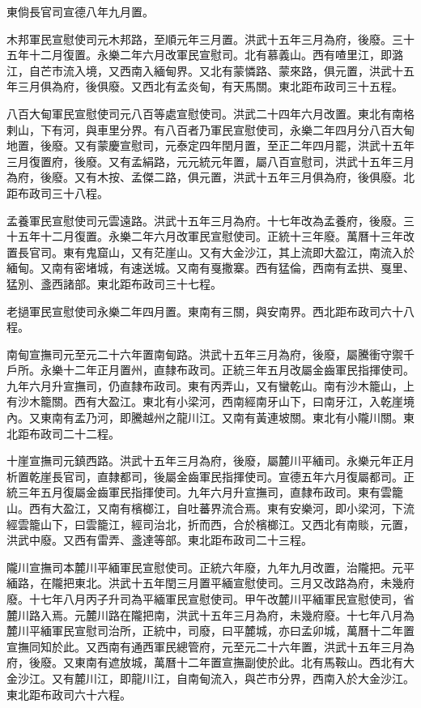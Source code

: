 東倘長官司宣德八年九月置。

木邦軍民宣慰使司元木邦路，至順元年三月置。洪武十五年三月為府，後廢。三十五年十二月復置。永樂二年六月改軍民宣慰司。北有慕義山。西有喳里江，即潞江，自芒市流入境，又西南入緬甸界。又北有蒙憐路、蒙來路，俱元置，洪武十五年三月俱為府，後俱廢。又西北有孟炎甸，有天馬關。東北距布政司三十五程。

八百大甸軍民宣慰使司元八百等處宣慰使司。洪武二十四年六月改置。東北有南格剌山，下有河，與車里分界。有八百者乃軍民宣慰使司，永樂二年四月分八百大甸地置，後廢。又有蒙慶宣慰司，元泰定四年閏月置，至正二年四月罷，洪武十五年三月復置府，後廢。又有孟絹路，元元統元年置，屬八百宣慰司，洪武十五年三月為府，後廢。又有木按、孟傑二路，俱元置，洪武十五年三月俱為府，後俱廢。北距布政司三十八程。

孟養軍民宣慰使司元雲遠路。洪武十五年三月為府。十七年改為孟養府，後廢。三十五年十二月復置。永樂二年六月改軍民宣慰使司。正統十三年廢。萬曆十三年改置長官司。東有鬼窟山，又有茫崖山。又有大金沙江，其上流即大盈江，南流入於緬甸。又南有密堵城，有速送城。又南有戛撒寨。西有猛倫，西南有孟拱、戛里、猛別、盞西諸部。東北距布政司三十七程。

老撾軍民宣慰使司永樂二年四月置。東南有三關，與安南界。西北距布政司六十八程。

南甸宣撫司元至元二十六年置南甸路。洪武十五年三月為府，後廢，屬騰衝守禦千戶所。永樂十二年正月置州，直隸布政司。正統三年五月改屬金齒軍民指揮使司。九年六月升宣撫司，仍直隸布政司。東有丙弄山，又有蠻乾山。南有沙木籠山，上有沙木籠關。西有大盈江。東北有小梁河，西南經南牙山下，曰南牙江，入乾崖境內。又東南有孟乃河，即騰越州之龍川江。又南有黃連坡關。東北有小隴川關。東北距布政司二十二程。

十崖宣撫司元鎮西路。洪武十五年三月為府，後廢，屬麓川平緬司。永樂元年正月析置乾崖長官司，直隸都司，後屬金齒軍民指揮使司。宣德五年六月復屬都司。正統三年五月復屬金齒軍民指揮使司。九年六月升宣撫司，直隸布政司。東有雲籠山。西有大盈江，又南有檳榔江，自吐蕃界流合焉。東有安樂河，即小梁河，下流經雲籠山下，曰雲籠江，經司治北，折而西，合於檳榔江。又西北有南賧，元置，洪武中廢。又西有雷弄、盞達等部。東北距布政司二十三程。

隴川宣撫司本麓川平緬軍民宣慰使司。正統六年廢，九年九月改置，治隴把。元平緬路，在隴把東北。洪武十五年閏三月置平緬宣慰使司。三月又改路為府，未幾府廢。十七年八月丙子升司為平緬軍民宣慰使司。甲午改麓川平緬軍民宣慰使司，省麓川路入焉。元麓川路在隴把南，洪武十五年三月為府，未幾府廢。十七年八月為麓川平緬軍民宣慰司治所，正統中，司廢，曰平麓城，亦曰孟卯城，萬曆十二年置宣撫同知於此。又西南有通西軍民總管府，元至元二十六年置，洪武十五年三月為府，後廢。又東南有遮放城，萬曆十二年置宣撫副使於此。北有馬鞍山。西北有大金沙江。又有麓川江，即龍川江，自南甸流入，與芒市分界，西南入於大金沙江。東北距布政司六十六程。

